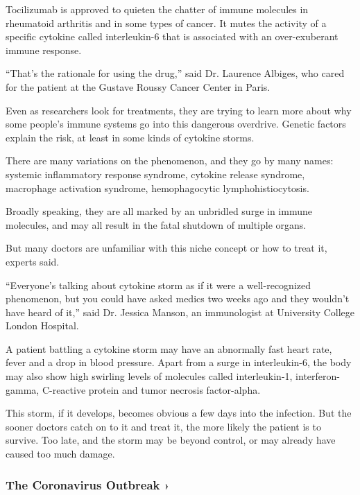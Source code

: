 Tocilizumab is approved to quieten the chatter of immune molecules in
rheumatoid arthritis and in some types of cancer. It mutes the activity
of a specific cytokine called interleukin-6 that is associated with an
over-exuberant immune response.

``That's the rationale for using the drug,'' said Dr. Laurence Albiges,
who cared for the patient at the Gustave Roussy Cancer Center in Paris.

Even as researchers look for treatments, they are trying to learn more
about why some people's immune systems go into this dangerous overdrive.
Genetic factors explain the risk, at least in some kinds of cytokine
storms.

There are many variations on the phenomenon, and they go by many names:
systemic inflammatory response syndrome, cytokine release syndrome,
macrophage activation syndrome, hemophagocytic lymphohistiocytosis.

Broadly speaking, they are all marked by an unbridled surge in immune
molecules, and may all result in the fatal shutdown of multiple organs.

But many doctors are unfamiliar with this niche concept or how to treat
it, experts said.

``Everyone's talking about cytokine storm as if it were a
well-recognized phenomenon, but you could have asked medics two weeks
ago and they wouldn't have heard of it,'' said Dr. Jessica Manson, an
immunologist at University College London Hospital.

A patient battling a cytokine storm may have an abnormally fast heart
rate, fever and a drop in blood pressure. Apart from a surge in
interleukin-6, the body may also show high swirling levels of molecules
called interleukin-1, interferon-gamma, C-reactive protein and tumor
necrosis factor-alpha.

This storm, if it develops, becomes obvious a few days into the
infection. But the sooner doctors catch on to it and treat it, the more
likely the patient is to survive. Too late, and the storm may be beyond
control, or may already have caused too much damage.

\href{https://www.nytimes3xbfgragh.onion/news-event/coronavirus?action=click\&pgtype=Article\&state=default\&region=MAIN_CONTENT_3\&context=storylines_faq}{}

\hypertarget{the-coronavirus-outbreak-}{%
\subsubsection{The Coronavirus Outbreak
›}\label{the-coronavirus-outbreak-}}

